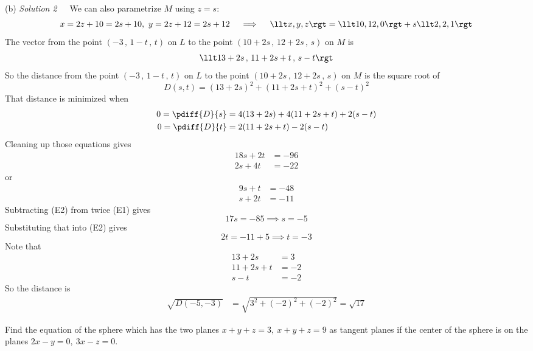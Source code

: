 \begin{solution}
(b) \emph{Solution 2}\ \ \ 
We can also parametrize $M$ using $z=s$:
\begin{equation*}
x=2z+10=2s+10,\ 
y=2z+12=2s+12\quad\implies\quad
\llt x,y,z\rgt = \llt 10,12,0\rgt +s \llt 2,2,1\rgt
\end{equation*}
The vector from the point  $(-3\,,\,1-t\,,\,t)$ on $L$
to the point $(10+2s\,,\,12+2s\,,\,s)$ on $M$ is
\begin{equation*}
\llt 13+2s \,,\, 11+2s+t \,,\, s-t \rgt
\end{equation*}
So the distance from the point  $(-3\,,\,1-t\,,\,t)$ on $L$
to the point $(10+2s\,,\,12+2s\,,\,s)$ on $M$ is the square root of
\begin{equation*}
D(s,t) = (13+2s)^2 +(11+2s+t)^2 +(s-t)^2
\end{equation*}
That distance is minimized when
\begin{align*}
0 = \pdiff{D}{s} &=4(13+2s) +4(11+2s+t) +2(s-t) \\
0 = \pdiff{D}{t} &=2(11+2s+t) -2(s-t) 
\end{align*}
Cleaning up those equations gives
\begin{align*}
18s +2t &= -96 \\
2s  +4t &=-22
\end{align*}
or
\begin{align*}
9s +t &=-48 \tag{E1}\\
 s+2t &=-11 \tag{E2}
\end{align*}
Subtracting (E2) from twice (E1) gives
\begin{equation*}
17s = -85 \implies s=-5
\end{equation*}
Substituting that into (E2) gives
\begin{equation*}
2t= -11 +5 \implies t = -3
\end{equation*}
Note that
\begin{align*}
13+2s &= 3
\\
11+2s+t &= -2
\\
s-t &= -2
\end{align*}
So the distance is
\begin{align*}
\sqrt{D(-5,-3)}
&=\sqrt{3^2 + (-2)^2 + (-2)^2}
=\sqrt{17}       
\end{align*}
\end{solution}


\begin{question}
Find the equation of the sphere which has the two planes
$x+y+z=3,\ x+y+z=9$ as tangent planes if the center of the sphere is on
the planes $2x-y=0,\ 3x-z=0$.
\end{question}

